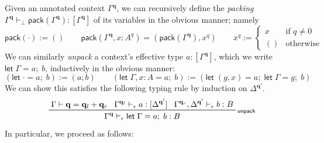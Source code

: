 \documentclass[acmsmall,screen,anonymous,review]{acmart}
\newcommand{\mb}[1]{\ensuremath{\mathbf{#1}}}
\newcommand{\ms}[1]{\ensuremath{\mathsf{#1}}}
\newcommand{\letexpr}[3]{\ensuremath{\ms{let}\;#1 = #2;\;#3}}
\newcommand{\qsp}[4]{#1 \vdash #2 = #3 + #4}
\newcommand{\rle}[1]{{\scriptsize\textsf{#1}}}
\newcommand{\hasty}[4]{#1 \vdash_{#2} #3: {#4}}
\newcommand{\etoty}[1]{[#1]}
\begin{document}
Given an annotated context $\Gamma^{\mb{q}}$, we can recursively define the \emph{packing}
$\hasty{\Gamma^{\mb{q}}}{\bot}{\ms{pack}(\Gamma^{\mb{q}})}{\etoty{\Gamma^{\mb{q}}}}$ of its
variables in the obvious manner; namely
\begin{equation*}
  \ms{pack}(\cdot) := () \qquad
  \ms{pack}(\Gamma^{\mb{q}}, x : A^q) = (\ms{pack}(\Gamma^{\mb{q}}), x^q) \qquad
  x^q :=
  \begin{cases}
    x & \text{if } q \neq 0 \\
    () & \text{otherwise}
  \end{cases}
\end{equation*}
We can similarly \emph{unpack} a context's effective type $a : [\ms{\Gamma}^{\mb{q}}]$, which we
write $\letexpr{\Gamma}{a}{b}$, inductively in the obvious manner:
\begin{equation*}
  (\letexpr{\cdot}{a}{b}) := (a ; b) \qquad
  (\letexpr{\Gamma, x : A}{a}{b}) :=
  (\letexpr{(g, x)}{a}{\letexpr{\Gamma}{g}{b}}) 
\end{equation*}
We can show this satisfies the following typing rule by induction on $\Delta^{\mb{q}'}$.
\begin{equation*}
  \prftree[r]{\rle{unpack}}
    {\qsp{\Gamma}{\mb{q}}{\mb{q}_l}{\mb{q}_r}}
    {\hasty{\Gamma^{\mb{q}_l}}{\epsilon}{a}{[\Delta^{\mb{q}'}]}}
    {\hasty{\Gamma^{\mb{q}_r}, \Delta^{\mb{q}'}}{\epsilon}{b}{B}}
    {\hasty{\Gamma^{\mb{q}}}{\epsilon}{\letexpr{\Gamma}{a}{b}}{B}}
\end{equation*}
In particular, we proceed as follows:
\end{document}
